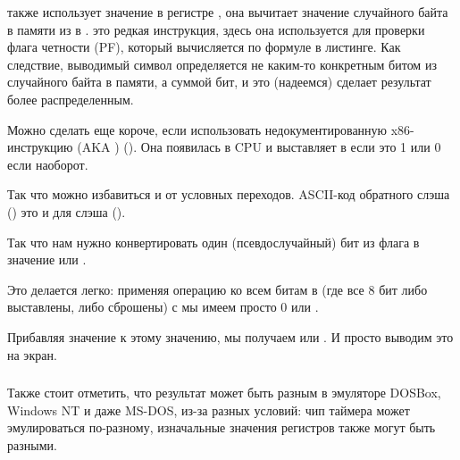  также использует значение в регистре , она вычитает значение
случайного байта в памяти из
  в .
 это редкая инструкция, здесь она используется для проверки флага четности (PF),
который вычисляется по формуле в листинге.
Как следствие, выводимый символ определяется не каким-то конкретным битом из случайного байта в памяти,
а суммой бит, и это (надеемся) сделает результат более распределенным.

Можно сделать еще короче, если использовать недокументированную x86-инструкцию  (\ac{AKA} ) ().
Она появилась в \ac{CPU} и выставляет  в 
 если  это 1 или 0 если наоборот.



Так что можно избавиться и от условных переходов.
\ac{ASCII}-код обратного слэша (\q{\textbackslash{}}) 
это  и  для слэша (\q{/}).

Так что нам нужно конвертировать один (псевдослучайный) бит из флага  в значение  или .

%
Это делается легко: применяя операцию  ко всем битам в  (где все 8 бит либо выставлены, либо сброшены) с  мы имеем просто 0 или .

%
Прибавляя значение  к этому значению, мы получаем  или .
И просто выводим это на экран.

\subsubsection{\Conclusion{}}

Также стоит отметить, что результат может быть разным в эмуляторе DOSBox, \gls{Windows NT} и даже MS-DOS, 
из-за разных условий:
чип таймера может эмулироваться по-разному, изначальные значения регистров также могут быть разными.
